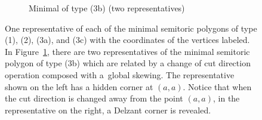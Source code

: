 \documentclass[pdftex]{sigma}
\numberwithin{equation}{section}
\begin{document}
\begin{figure}[t]
 \begin{subfigure}{.9\textwidth}
 \centering
 \caption{Minimal of type (3b) (two representatives)}
 \label{fig:stmin-3b}
 \end{subfigure}
 \caption{One representative of each of the minimal semitoric polygons of type (1), (2), (3a), and (3c) with the coordinates of the vertices labeled.
 In Figure~\ref{fig:stmin-3b}, there are two representatives of the minimal semitoric polygon of type (3b) which are related by a change of cut direction operation composed with a~global skewing. The representative shown on the left has a hidden corner at $(a,a)$. Notice that when the cut direction is changed away from the point $(a,a)$, in the representative on the right, a Delzant corner is revealed.}
 \label{fig:semitoric-polygon-examples}
\end{figure}
\end{document}

